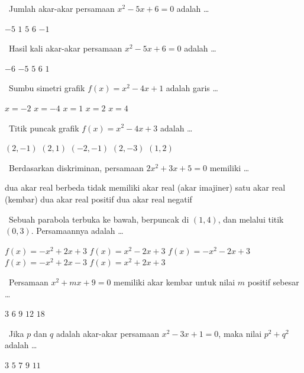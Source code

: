 \documentclass[11pt,a4paper]{exam}
\newcommand{\Fund}{{\footnotesize\textsf{\textcolor{hijau}{[Fundamental]}}}\ }
\newcommand{\Inter}{{\footnotesize\textsf{\textcolor{biru}{[Intermediate]}}}\ }
\newcommand{\Adv}{{\footnotesize\textsf{\textcolor{oranye}{[Advanced]}}}\ }
\newcommand{\Exp}{{\footnotesize\textsf{\textcolor{ungu}{[Expert]}}}\ }
\newcommand{\topik}[1]{%
  \par\addvspace{14pt}%
  \noindent{\large\bfseries\color{biru}#1}\par\addvspace{6pt}}
\begin{document}
\begin{questions}
\topik{6. Fungsi Kuadrat (8 Soal)}

\question \Fund Jumlah akar-akar persamaan $x^{2} - 5x + 6 = 0$ adalah \dots
\begin{choices}
\choice $-5$ \choice $1$ \CorrectChoice $5$ \choice $6$ \choice $-1$
\end{choices}

\question \Fund Hasil kali akar-akar persamaan $x^{2} - 5x + 6 = 0$ adalah \dots
\begin{choices}
\choice $-6$ \choice $-5$ \choice $5$ \CorrectChoice $6$ \choice $1$
\end{choices}

\question \Fund Sumbu simetri grafik $f(x) = x^{2} - 4x + 1$ adalah garis \dots
\begin{choices}
\choice $x = -2$ \choice $x = -4$ \choice $x = 1$ \CorrectChoice $x = 2$ \choice $x = 4$
\end{choices}

\question \Inter Titik puncak grafik $f(x) = x^{2} - 4x + 3$ adalah \dots
\begin{choices}
\CorrectChoice $(2,-1)$ \choice $(2,1)$ \choice $(-2,-1)$ \choice $(2,-3)$ \choice $(1,2)$
\end{choices}

\question \Inter Berdasarkan diskriminan, persamaan $2x^{2} + 3x + 5 = 0$ memiliki \dots
\begin{choices}
\choice dua akar real berbeda
\CorrectChoice tidak memiliki akar real (akar imajiner)
\choice satu akar real (kembar)
\choice dua akar real positif
\choice dua akar real negatif
\end{choices}

\question \Inter Sebuah parabola terbuka ke bawah, berpuncak di $(1,4)$, dan melalui
titik $(0,3)$. Persamaannya adalah \dots
\begin{choices}
\CorrectChoice $f(x) = -x^{2} + 2x + 3$
\choice $f(x) = x^{2} - 2x + 3$
\choice $f(x) = -x^{2} - 2x + 3$
\choice $f(x) = -x^{2} + 2x - 3$
\choice $f(x) = x^{2} + 2x + 3$
\end{choices}

\question \Adv Persamaan $x^{2} + mx + 9 = 0$ memiliki akar kembar untuk nilai $m$
positif sebesar \dots
\begin{choices}
\choice $3$ \CorrectChoice $6$ \choice $9$ \choice $12$ \choice $18$
\end{choices}

\question \Exp Jika $p$ dan $q$ adalah akar-akar persamaan $x^{2} - 3x + 1 = 0$, maka
nilai $p^{2} + q^{2}$ adalah \dots
\begin{choices}
\choice $3$ \choice $5$ \CorrectChoice $7$ \choice $9$ \choice $11$
\end{choices}


\end{questions}
\end{document}
